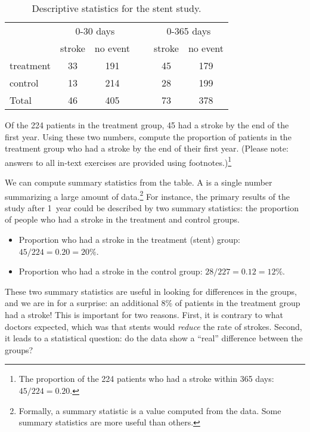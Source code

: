 \begin{table}[h]
\centering
\begin{tabular}{l cc c cc}
& \multicolumn{2}{c}{0-30 days} &\hspace{5mm}\ & \multicolumn{2}{c}{0-365 days} \\
  \cline{2-3} \cline{5-6}
	& 	stroke 	& no event && 	stroke 	& no event \\
  \hline
treatment 	& 33		& 191	&&	45 	& 179 \\
control 		& 13		& 214	&& 	28	& 199 \\
  \hline
Total				& 46		& 405	&&	73	& 378 \\
  \hline
\end{tabular}
\caption{Descriptive statistics for the stent study.}
\label{stentStudyResults}
\end{table}

\begin{exercise}
Of the 224 patients in the treatment group, 45 had a stroke by the end of the first year. Using these two numbers, compute the proportion of patients in the treatment group who had a stroke by the end of their first year. (Please note: answers to all in-text exercises are provided using footnotes.)\footnote{The proportion of the 224 patients who had a stroke within 365 days: $45/224 = 0.20$.}
\end{exercise}

We can compute summary statistics from the table. A  is a single number summarizing a large amount of data.\footnote{Formally, a summary statistic is a value computed from the data. Some summary statistics are more useful than others.} For instance, the primary results of the study after 1~year could be described by two summary statistics: the proportion of people who had a stroke in the treatment and control groups.
\begin{itemize}
\setlength{\itemsep}{0mm}
\item[] Proportion who had a stroke in the treatment (stent) group: $45/224 = 0.20 = 20\%$.
\item[] Proportion who had a stroke in the control group: $28/227 = 0.12 = 12\%$.
\end{itemize}
These two summary statistics are useful in looking for differences in the groups, and we are in for a surprise: an additional 8\% of patients in the treatment group had a stroke! This is important for two reasons. First, it is contrary to what doctors expected, which was that stents would \emph{reduce} the rate of strokes. Second, it leads to a statistical question: do the data show a ``real'' difference between the groups?

